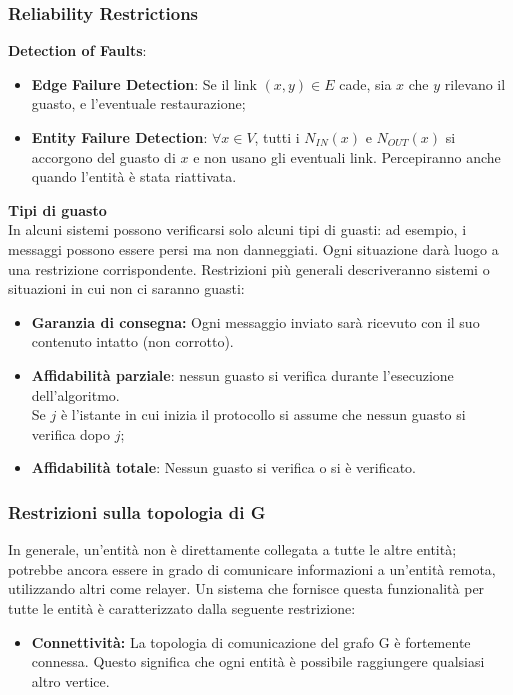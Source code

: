\subsubsection{Reliability Restrictions}
\textbf{Detection of Faults}:
\begin{itemize}
  \item \textbf{Edge Failure Detection}: Se il link $(x, y) \in E$ cade, sia $x$ che $y$ rilevano il guasto, e l'eventuale restaurazione;
  \item \textbf{Entity Failure Detection}: $\forall x \in  V$, tutti i $N_{IN}(x)$ e $N_{OUT}(x)$ si accorgono del guasto di $x$ e non usano gli eventuali link. Percepiranno anche quando l'entità è stata riattivata.
\end{itemize}

\textbf{Tipi di guasto}\\
In alcuni sistemi possono verificarsi solo alcuni tipi di guasti: ad esempio, i messaggi possono essere persi ma non danneggiati. Ogni situazione darà luogo a una restrizione corrispondente. Restrizioni più generali descriveranno sistemi o situazioni in cui non ci saranno guasti:
\begin{itemize}
  \item \textbf{Garanzia di consegna:} Ogni messaggio inviato sarà ricevuto con il suo contenuto intatto (non corrotto).
  \item \textbf{Affidabilità parziale}: nessun guasto si verifica durante l'esecuzione dell'algoritmo.\\
  Se $j$ è l'istante in cui inizia il protocollo si assume che nessun guasto si verifica dopo $j$;
  \item \textbf{Affidabilità totale}: Nessun guasto si verifica o si è verificato.
\end{itemize}

\subsubsection{Restrizioni sulla topologia di G}
In generale, un'entità non è direttamente collegata a tutte le altre entità; potrebbe ancora essere in grado di comunicare informazioni a un'entità remota, utilizzando altri come relayer. Un sistema che fornisce questa funzionalità per tutte le entità è caratterizzato dalla seguente restrizione:
\begin{itemize}
    \item \textbf{ Connettività:} La topologia di comunicazione del grafo G è fortemente connessa. Questo significa che ogni entità è possibile raggiungere qualsiasi altro vertice.
\end{itemize}

